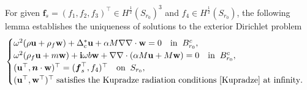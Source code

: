 \documentclass[11pt]{article}
\newcommand{\bs}{\boldsymbol}
\begin{document}
For given $\bs{f}_s=(f_1,f_2,f_3)^{\top}\in H^{\frac{1}{2}}(S_{r_0})^3$ and $f_4\in H^{\frac{1}{2}}(S_{r_0})$,  
the following lemma establishes the uniqueness of solutions to the exterior Dirichlet problem
\begin{equation}\label{eDpp1}
\begin{cases}
\omega^2(\rho\mathbf{u} +\rho_f \mathbf{w})+\Delta_c^*\mathbf{u}+\alpha M \nabla \nabla \cdot \mathbf{w}=0 
\quad {\rm in}\;\;B_{r_0}^c,\\
\omega^2(\rho_f \mathbf{u}+m \mathbf{w})+{\bf{i}}\omega b \mathbf{w}+\nabla \nabla \cdot (\alpha M \mathbf{u}
+ M \mathbf{w})=0 \quad {\rm in}\;\;B_{r_0}^c,\\
(\mathbf{u}^{\top},	\bs{n}\cdot \mathbf{w})^{\top}=(\bs{f}_s^{\top},f_4)^{\top} \quad {\rm on} \;\;S_{r_0},\\
(\mathbf{u}^{\top},	\mathbf{w}^{\top})^{\top}\;\text{satisfies the Kupradze radiation conditions 
\eqref{Kupradze} at infinity}.
\end{cases}
\end{equation}
\end{document}
